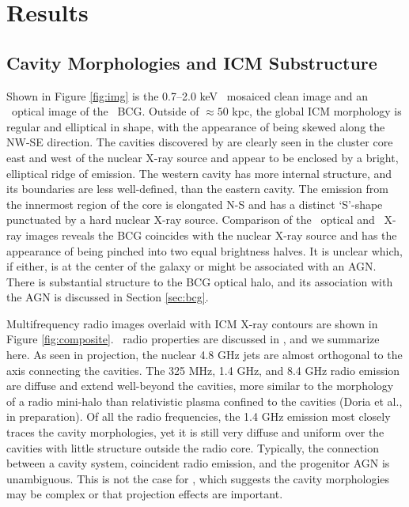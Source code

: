 \documentclass[11pt, preprint]{aastex}
\begin{document}
\section{Results}
\label{sec:results}

\subsection{Cavity Morphologies and ICM Substructure}
\label{sec:morph}

Shown in Figure \ref{fig:img} is the 0.7--2.0 keV \cxo\ mosaiced clean
image and an \hst\ optical image of the \rbs\ BCG. Outside of $\approx
50$ kpc, the global ICM morphology is regular and elliptical in shape,
with the appearance of being skewed along the NW-SE direction. The
cavities discovered by \citet{schindler01} are clearly seen in the
cluster core east and west of the nuclear X-ray source and appear to
be enclosed by a bright, elliptical ridge of emission. The western
cavity has more internal structure, and its boundaries are less
well-defined, than the eastern cavity. The emission from the innermost
region of the core is elongated N-S and has a distinct `S'-shape
punctuated by a hard nuclear X-ray source. Comparison of the
\hst\ optical and \cxo\ X-ray images reveals the BCG coincides with
the nuclear X-ray source and has the appearance of being pinched into
two equal brightness halves. It is unclear which, if either, is at the
center of the galaxy or might be associated with an AGN. There is
substantial structure to the BCG optical halo, and its association
with the AGN is discussed in Section \ref{sec:bcg}.

Multifrequency radio images overlaid with ICM X-ray contours are shown
in Figure \ref{fig:composite}. \rbs\ radio properties are discussed in
\citet{gitti06}, and we summarize here. As seen in projection, the
nuclear 4.8 GHz jets are almost orthogonal to the axis connecting the
cavities. The 325 MHz, 1.4 GHz, and 8.4 GHz radio emission are diffuse
and extend well-beyond the cavities, more similar to the morphology of
a radio mini-halo than relativistic plasma confined to the cavities
(Doria et al., in preparation). Of all the radio frequencies, the 1.4
GHz emission most closely traces the cavity morphologies, yet it is
still very diffuse and uniform over the cavities with little structure
outside the radio core. Typically, the connection between a cavity
system, coincident radio emission, and the progenitor AGN is
unambiguous. This is not the case for \rbs, which suggests the cavity
morphologies may be complex or that projection effects are
important.
\end{document}
